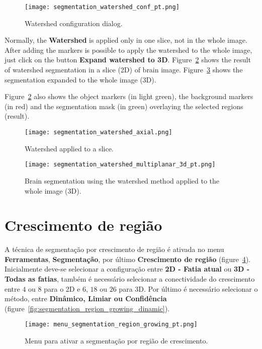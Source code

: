 \begin{figure}[!htb]
    \centering
    \texttt{[image: segmentation\_watershed\_conf\_pt.png]}
    \caption{Watershed configuration dialog.}
    \label{fig:watershed_janela_conf}
\end{figure}

Normally, the \textbf{Watershed} is applied only in one slice, not in the whole image. After adding the markers is possible to apply the watershed to the whole image, just click on the button \textbf{Expand watershed to 3D}. Figure~\ref{fig:watershed_2d} shows the result of watershed segmentation in a slice (2D) of brain image. Figure~\ref{fig:watershed_3d} shows the segmentation expanded to the whole image (3D).

Figure~\ref{fig:watershed_2d} also shows the object markers (in light green), the background markers (in red) and the segmentation mask (in green) overlaying the selected regions (result).

\begin{figure}[!htb]
\centering
\texttt{[image: segmentation\_watershed\_axial.png]}
\caption{Watershed applied to a slice.}
\label{fig:watershed_2d}
\end{figure}

\begin{figure}[!htb]
\centering
\texttt{[image: segmentation\_watershed\_multiplanar\_3d\_pt.png]}
\caption{Brain segmentation using the watershed method applied to the whole image (3D).}
\label{fig:watershed_3d}
\end{figure}

\section{Crescimento de região}

A técnica de segmentação por crescimento de região é ativada no menu \textbf{Ferramentas}, \textbf{Segmentação}, por último \textbf{Crescimento de região} (figure~\ref{fig:menu_segmentation_region_growing}). Inicialmente deve-se selecionar a configuração entre \textbf{2D - Fatia atual} ou \textbf{3D - Todas as fatias}, também é necessário selecionar a conectividade do crescimento entre $4$ ou $8$ para o 2D e $6$, $18$ ou $26$ para 3D. Por último é necessário selecionar o método, entre \textbf{Dinâmico, Limiar ou Confidência} (figure~\ref{fig:segmentation_region_growing_dinamic}).

\begin{figure}[!htb]
\centering
\texttt{[image: menu\_segmentation\_region\_growing\_pt.png]}
\caption{Menu para ativar a segmentação por região de crescimento.}
\label{fig:menu_segmentation_region_growing}
\end{figure}

